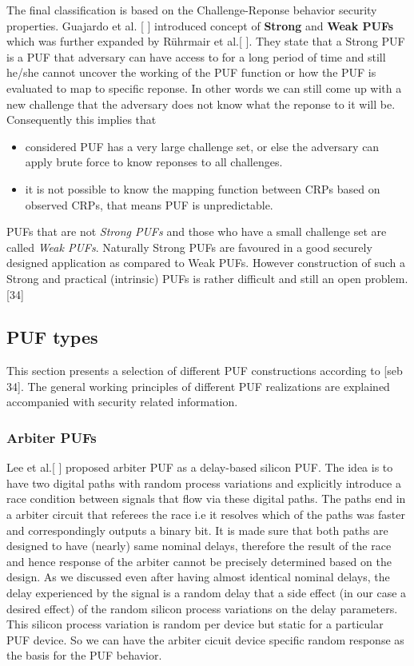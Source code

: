 The final classification is based on the Challenge-Reponse behavior security properties. Guajardo et al. [ ] introduced concept of \textbf{Strong} and \textbf{Weak PUFs} which was further expanded by Rührmair et al.[ ]. They state that a Strong PUF is a PUF that adversary can have access to for a long period of time and still he/she cannot uncover the working of the PUF function or how the PUF is evaluated to map to specific reponse. In other words we can still come up with a
new challenge that the adversary does not know what the reponse to it will be. Consequently this implies that
\begin{itemize}
	\item considered PUF has a very large challenge set, or else the adversary can apply brute force to know reponses to all challenges.
	\item it is not possible to know the mapping function between CRPs based on observed CRPs, that means PUF is unpredictable.
\end{itemize}
PUFs that are not \emph{Strong PUFs} and those who have a small challenge set are called \emph{Weak PUFs}. Naturally Strong PUFs are favoured in a good securely designed application as compared to Weak PUFs. However construction of such a Strong and practical (intrinsic) PUFs is rather difficult and still an open problem. [34]\\

\subsection{PUF types}
This section presents a selection of different PUF constructions according to [seb 34]. The general working principles of different PUF realizations are explained accompanied with security related information.

\subsubsection{Arbiter PUFs}
\label{arbiterpuf}

Lee et al.[ ] proposed arbiter PUF as a delay-based silicon PUF. The idea is to have two digital paths with random process variations and explicitly introduce a race condition between signals that flow via these digital paths. The paths end in a arbiter circuit that referees the race i.e it resolves which of the paths was faster and correspondingly outputs a binary bit. It is made sure that both paths are designed to have (nearly) same nominal delays, therefore the result of the race and hence response of the arbiter cannot be precisely determined based on the design. As we discussed even after having almost identical nominal delays, the delay experienced by the signal is a random delay that a side effect (in our case a desired effect) of the random silicon process variations on the delay parameters. This silicon process variation is random per device but static for a particular PUF device. So we can have the arbiter cicuit device specific random response as the basis for the PUF
behavior.\\

